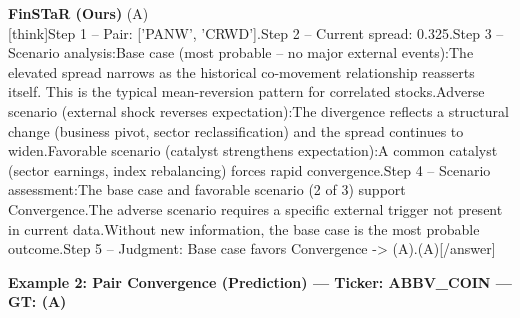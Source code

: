 \begin{minipage}[t]{0.41\textwidth}
\colorbox{green!10}{\parbox{\dimexpr\textwidth-2\fboxsep}{
\textbf{FinSTaR (Ours)} \textcolor{green!50!black}{(A)} \\[2pt]
\tiny
[think]\newline Step 1 -- Pair: ['PANW', 'CRWD'].\newline Step 2 -- Current spread: 0.325.\newline Step 3 -- Scenario analysis:\newline   Base case (most probable -- no major external events):\newline     The elevated spread narrows as the historical co-movement relationship reasserts itself. This is the typical mean-reversion pattern for correlated stocks.\newline   Adverse scenario (external shock reverses expectation):\newline     The divergence reflects a structural change (business pivot, sector reclassification) and the spread continues to widen.\newline   Favorable scenario (catalyst strengthens expectation):\newline     A common catalyst (sector earnings, index rebalancing) forces rapid convergence.\newline Step 4 -- Scenario assessment:\newline   The base case and favorable scenario (2 of 3) support Convergence.\newline   The adverse scenario requires a specific external trigger not present in current data.\newline   Without new information, the base case is the most probable outcome.\newline Step 5 -- Judgment: Base case favors Convergence -> (A).\newline [/think]\newline [answer](A)[/answer]
}}
\end{minipage}
\vspace{8pt}


\noindent
\textbf{Example 2: Pair Convergence (Prediction) --- Ticker: ABBV\_COIN --- GT: (A)}
\vspace{2pt}

